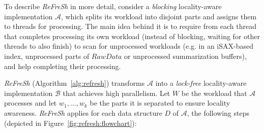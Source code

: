 To describe \textit{ReFreSh} in more detail, consider a {\em blocking} locality-aware
implementation $\mathcal{A}$, which splits its workload into disjoint parts and assigns them to 
threads for processing. 
% 
The main idea behind it is to require from each thread that completes processing
its own workload (instead of blocking, waiting for other threads to also finish) 
to scan for unprocessed workloads (e.g. in an iSAX-based index, unprocessed parts of $RawData$
or unprocessed summarization buffers), and help completing their processing. 

\textit{ReFreSh} (Algorithm~\ref{alg:refresh}) transforms $\mathcal{A}$ into a {\em lock-free} 
locality-aware implementation $\mathcal{B}$ that achieves high parallelism. 
% 
Let $W$ be the workload that $\mathcal{A}$ processes 
and let $w_1, \ldots, w_k$ be the parts it is separated to ensure locality awareness.
\textit{ReFreSh} applies for each data structure $D$ of $\mathcal{A}$, 
the following steps (depicted in Figure~\ref{fig:refresh:flowchart}):



